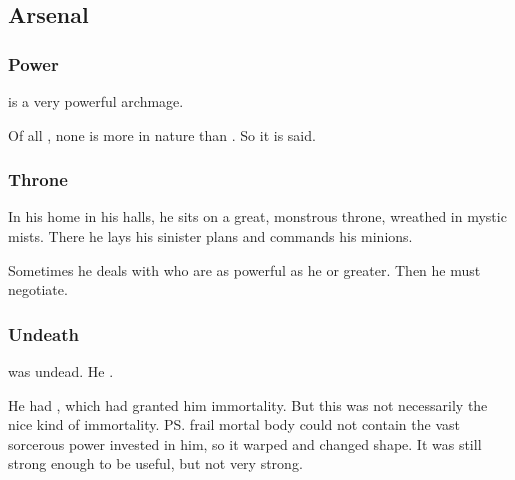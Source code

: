 \subsection{Arsenal}





\subsubsection{Power}
\Psyrex{} is a very powerful archmage.

Of all \scathae, none is more \draconian{} in nature than \LocarPsyrex. 
So it is said. 





\subsubsection{Throne}
In his home in his \daemonic{} halls, he sits on a great, monstrous throne, wreathed in mystic mists. There he lays his sinister plans and commands his \daemonic{} minions. 

Sometimes he deals with \daemons{} who are as powerful as he or greater. Then he must negotiate. 






\subsubsection{Undeath}
\Psyrex was undead.
He . 

He had , which had granted him immortality.
But this was not necessarily the nice kind of immortality. 
\ps{\Psyrex} frail mortal body could not contain the vast sorcerous power invested in him, so it warped and changed shape.
It was still strong enough to be useful, but not very strong.

